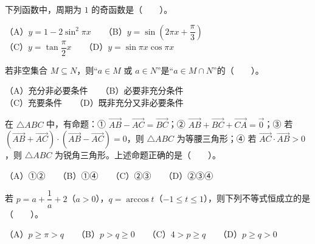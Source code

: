 \begin{question}
下列函数中，周期为 $1$ 的奇函数是\mbox{（　　）}。

（A）$y=1-2\sin^2\pi x$　　（B）$y=\sin\left(2\pi x+\dfrac{\pi}{3}\right)$\\
（C）$y=\tan\dfrac{\pi}{2}x$　　（D）$y=\sin\pi x\cos\pi x$

\end{question}
\begin{question}
若非空集合 $M\subseteq N$，则“$a\in M$ 或 $a\in N$”是“$a\in M\cap N$”的\mbox{（　　）}。

（A）充分非必要条件　　（B）必要非充分条件\\
（C）充要条件　　（D）既非充分又非必要条件

\end{question}
\begin{question}
在 $\triangle ABC$ 中，有命题：① $\overrightarrow{AB}-\overrightarrow{AC}=\overrightarrow{BC}$；② $\overrightarrow{AB}+\overrightarrow{BC}+\overrightarrow{CA}=\vec{0}$；③ 若 $(\overrightarrow{AB}+\overrightarrow{AC})\cdot(\overrightarrow{AB}-\overrightarrow{AC})=0$，则 $\triangle ABC$ 为等腰三角形；④ 若 $\overrightarrow{AC}\cdot\overrightarrow{AB}>0$，则 $\triangle ABC$ 为锐角三角形。上述命题正确的是\mbox{（　　）}。

（A）①②　　（B）①④　　（C）②③　　（D）②③④

\end{question}
\begin{question}
若 $p=a+\dfrac{1}{a}+2$（$a>0$），$q=\arccos t$（$-1\le t\le1$），则下列不等式恒成立的是\mbox{（　　）}。

（A）$p\ge\pi>q$　　（B）$p>q\ge0$　　（C）$4>p\ge q$　　（D）$p\ge q>0$

\end{question}

